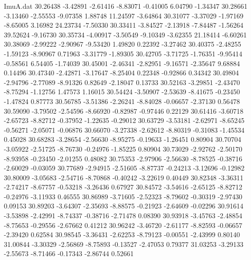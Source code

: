 \begin{filecontents}{ImuA.dat}
  30.26438   -3.42891   -2.61416   -8.83071   -0.41005    6.04790   -1.34347
  30.28661   -3.13460   -2.55553   -9.07358    1.88748   11.24597   -3.64864
  30.31077   -3.37029   -1.97169   -8.65005    3.16982   24.23734   -7.50330
  30.33411   -3.84527   -2.13918   -7.84487   -1.56264   39.52624   -9.16730
  30.35734   -4.00917   -3.50549   -9.10349   -3.62355   21.18414   -6.60261
  30.38069   -2.99222   -2.90967   -9.53420    1.49820    0.22392   -3.27462
  30.40375   -2.48255   -1.59123   -8.90967    0.71963   -3.31779   -1.89305
  30.42705   -3.71725   -1.76351   -9.95414   -0.58561    6.54405   -1.74039
  30.45001   -2.46341   -2.82951   -9.16571   -2.35647    9.68884    0.14496
  30.47340   -2.42871   -3.17647   -8.25404    0.22348   -0.92866    0.34342
  30.49804   -2.94796   -2.77089   -8.91326    0.82649   -2.18047    0.13733
  30.52163   -3.29851   -2.43470   -8.75294   -1.12756    1.47573    1.16015
  30.54424   -3.50907   -2.53639   -8.41675   -0.23450   -1.47824    0.87773
  30.56785   -3.51386   -2.26241   -8.84028   -0.06657   -2.37130    0.56478
  30.59090   -3.79502   -2.54596   -8.66920   -0.82987   -0.97446    0.22129
  30.61416   -3.60718   -2.65723   -8.82712   -0.37952   -1.22635   -0.29012
  30.63729   -3.53181   -2.62971   -8.65245   -0.56271   -2.05071   -0.06876
  30.66070   -3.27338   -2.62612   -8.80319   -0.31083   -1.45534    0.45028
  30.68283   -3.28654   -2.56630   -8.95275   -0.19633   -1.26451    0.80904
  30.70704   -3.05922   -2.51725   -8.76730   -0.24976   -1.85225    0.80904
  30.73029   -2.92762   -2.50170   -8.93958   -0.23450   -2.01255    0.48082
  30.75353   -2.97906   -2.56630   -8.78525   -0.38716   -2.60029   -0.03059
  30.77689   -2.94915   -2.51605   -8.87737   -0.24213   -3.12696   -0.12982
  30.80009   -3.05683   -2.54716   -8.70868   -0.40242   -3.22619    0.40449
  30.82348   -3.36311   -2.74217   -8.67757   -0.53218   -3.26436    0.67927
  30.84572   -3.54616   -2.65125   -8.82712   -0.24976   -3.11933    0.46555
  30.86989   -3.71605   -2.52323   -8.79602   -0.30319   -2.97430    0.09153
  30.89203   -3.64307   -2.35693   -8.88575   -0.21923   -2.64609   -0.02296
  30.91614   -3.53898   -2.42991   -8.74337   -0.38716   -2.71478    0.08390
  30.93918   -3.45763   -2.48854   -8.75653   -0.29556   -2.67662    0.41212
  30.96242   -3.46720   -2.61177   -8.82593   -0.06657   -2.39420    0.62584
  30.98545   -3.36431   -2.62253   -8.79123   -0.00551   -2.43999    0.80140
  31.00844   -3.30329   -2.56869   -8.75893   -0.13527   -2.47053    0.79377
  31.03253   -3.29133   -2.55673   -8.71466   -0.17343   -2.86744    0.52661

\end{filecontents}
